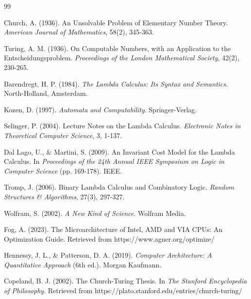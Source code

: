 \documentclass[12pt]{article}
\begin{document}
\begin{thebibliography}{99}

Church, A. (1936).
An Unsolvable Problem of Elementary Number Theory.
\textit{American Journal of Mathematics}, 58(2), 345-363.

Turing, A. M. (1936).
On Computable Numbers, with an Application to the Entscheidungsproblem.
\textit{Proceedings of the London Mathematical Society}, 42(2), 230-265.

Barendregt, H. P. (1984).
\textit{The Lambda Calculus: Its Syntax and Semantics}.
North-Holland, Amsterdam.

Kozen, D. (1997).
\textit{Automata and Computability}.
Springer-Verlag.

Selinger, P. (2004).
Lecture Notes on the Lambda Calculus.
\textit{Electronic Notes in Theoretical Computer Science}, 3, 1-137.

Dal Lago, U., \& Martini, S. (2009).
An Invariant Cost Model for the Lambda Calculus.
In \textit{Proceedings of the 24th Annual IEEE Symposium on Logic in Computer Science} (pp. 169-178). IEEE.

Tromp, J. (2006).
Binary Lambda Calculus and Combinatory Logic.
\textit{Random Structures \& Algorithms}, 27(3), 297-327.

Wolfram, S. (2002).
\textit{A New Kind of Science}.
Wolfram Media.

Fog, A. (2023).
The Microarchitecture of Intel, AMD and VIA CPUs: An Optimization Guide.
Retrieved from https://www.agner.org/optimize/

Hennessy, J. L., \& Patterson, D. A. (2019).
\textit{Computer Architecture: A Quantitative Approach} (6th ed.).
Morgan Kaufmann.

Copeland, B. J. (2002).
The Church-Turing Thesis.
In \textit{The Stanford Encyclopedia of Philosophy}.
Retrieved from https://plato.stanford.edu/entries/church-turing/



\end{thebibliography}
\end{document}
